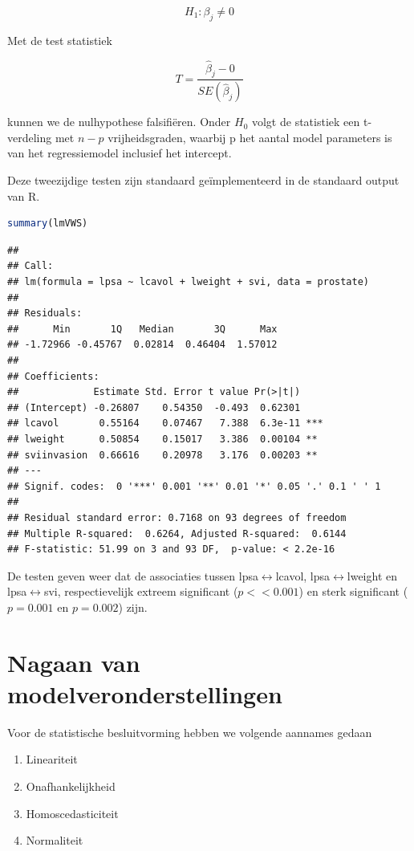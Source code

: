\documentclass[
  12pt,dutch,coursenotes]{book}
\providecommand{\tightlist}{%
  \setlength{\itemsep}{0pt}\setlength{\parskip}{0pt}}
\theoremstyle{definition}
\theoremstyle{definition}
\theoremstyle{definition}
\theoremstyle{definition}
\theoremstyle{remark}
\begin{document}
\[H_1: \beta_j\neq0\]

Met de test statistiek

\[T=\frac{\hat{\beta}_j-0}{SE(\hat{\beta}_j)}\]

kunnen we de nulhypothese falsifiëren. Onder \(H_0\) volgt de statistiek een t-verdeling met \(n-p\) vrijheidsgraden, waarbij p het aantal model parameters is van het regressiemodel inclusief het intercept.

Deze tweezijdige testen zijn standaard geïmplementeerd in de standaard output van R.

\begin{lstlisting}[language=R]
summary(lmVWS)
\end{lstlisting}

\begin{lstlisting}
## 
## Call:
## lm(formula = lpsa ~ lcavol + lweight + svi, data = prostate)
## 
## Residuals:
##      Min       1Q   Median       3Q      Max 
## -1.72966 -0.45767  0.02814  0.46404  1.57012 
## 
## Coefficients:
##             Estimate Std. Error t value Pr(>|t|)    
## (Intercept) -0.26807    0.54350  -0.493  0.62301    
## lcavol       0.55164    0.07467   7.388  6.3e-11 ***
## lweight      0.50854    0.15017   3.386  0.00104 ** 
## sviinvasion  0.66616    0.20978   3.176  0.00203 ** 
## ---
## Signif. codes:  0 '***' 0.001 '**' 0.01 '*' 0.05 '.' 0.1 ' ' 1
## 
## Residual standard error: 0.7168 on 93 degrees of freedom
## Multiple R-squared:  0.6264, Adjusted R-squared:  0.6144 
## F-statistic: 51.99 on 3 and 93 DF,  p-value: < 2.2e-16
\end{lstlisting}

De testen geven weer dat de associaties tussen lpsa\(\leftrightarrow\)lcavol, lpsa\(\leftrightarrow\)lweight en lpsa\(\leftrightarrow\)svi, respectievelijk extreem significant (\(p << 0.001\)) en sterk significant (\(p=0.001\) en \(p=0.002\)) zijn.

\hypertarget{nagaan-van-modelveronderstellingen-1}{%
\section{Nagaan van modelveronderstellingen}\label{nagaan-van-modelveronderstellingen-1}}

Voor de statistische besluitvorming hebben we volgende aannames gedaan

\begin{enumerate}
\def\labelenumi{\arabic{enumi}.}
\tightlist
\item
  Lineariteit
\item
  Onafhankelijkheid\\
\item
  Homoscedasticiteit
\item
  Normaliteit
\end{enumerate}
\end{document}
